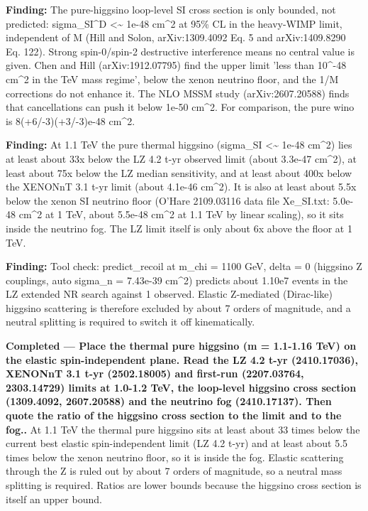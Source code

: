 \documentclass[11pt,a4paper]{article}
\begin{document}
\textbf{Finding:} The pure-higgsino loop-level SI cross section is only bounded, not predicted: sigma\_SI\textasciicircum{}D \textless{}\textasciitilde{} 1e-48 cm\textasciicircum{}2 at 95\% CL in the heavy-WIMP limit, independent of M (Hill and Solon, arXiv:1309.4092 Eq. 5 and arXiv:1409.8290 Eq. 122). Strong spin-0/spin-2 destructive interference means no central value is given. Chen and Hill (arXiv:1912.07795) find the upper limit 'less than 10\textasciicircum{}-48 cm\textasciicircum{}2 in the TeV mass regime', below the xenon neutrino floor, and the 1/M corrections do not enhance it. The NLO MSSM study (arXiv:2607.20588) finds that cancellations can push it below 1e-50 cm\textasciicircum{}2. For comparison, the pure wino is 8(+6/-3)(+3/-3)e-48 cm\textasciicircum{}2.

\textbf{Finding:} At 1.1 TeV the pure thermal higgsino (sigma\_SI \textless{}\textasciitilde{} 1e-48 cm\textasciicircum{}2) lies at least about 33x below the LZ 4.2 t-yr observed limit (about 3.3e-47 cm\textasciicircum{}2), at least about 75x below the LZ median sensitivity, and at least about 400x below the XENONnT 3.1 t-yr limit (about 4.1e-46 cm\textasciicircum{}2). It is also at least about 5.5x below the xenon SI neutrino floor (O'Hare 2109.03116 data file Xe\_SI.txt: 5.0e-48 cm\textasciicircum{}2 at 1 TeV, about 5.5e-48 cm\textasciicircum{}2 at 1.1 TeV by linear scaling), so it sits inside the neutrino fog. The LZ limit itself is only about 6x above the floor at 1 TeV.

\textbf{Finding:} Tool check: predict\_recoil at m\_chi = 1100 GeV, delta = 0 (higgsino Z couplings, auto sigma\_n = 7.43e-39 cm\textasciicircum{}2) predicts about 1.10e7 events in the LZ extended NR search against 1 observed. Elastic Z-mediated (Dirac-like) higgsino scattering is therefore excluded by about 7 orders of magnitude, and a neutral splitting is required to switch it off kinematically.

\textbf{Completed --- Place the thermal pure higgsino (m = 1.1-1.16 TeV) on the elastic spin-independent plane. Read the LZ 4.2 t-yr (2410.17036), XENONnT 3.1 t-yr (2502.18005) and first-run (2207.03764, 2303.14729) limits at 1.0-1.2 TeV, the loop-level higgsino cross section (1309.4092, 2607.20588) and the neutrino fog (2410.17137). Then quote the ratio of the higgsino cross section to the limit and to the fog..} At 1.1 TeV the thermal pure higgsino sits at least about 33 times below the current best elastic spin-independent limit (LZ 4.2 t-yr) and at least about 5.5 times below the xenon neutrino floor, so it is inside the fog. Elastic scattering through the Z is ruled out by about 7 orders of magnitude, so a neutral mass splitting is required. Ratios are lower bounds because the higgsino cross section is itself an upper bound.
\end{document}
